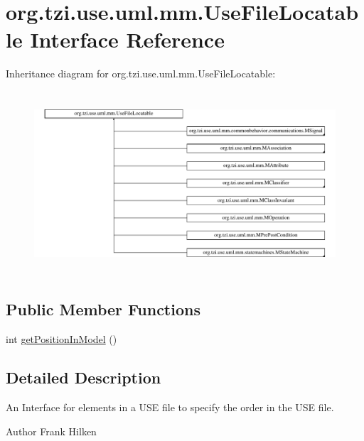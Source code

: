 \hypertarget{interfaceorg_1_1tzi_1_1use_1_1uml_1_1mm_1_1_use_file_locatable}{\section{org.\-tzi.\-use.\-uml.\-mm.\-Use\-File\-Locatable Interface Reference}
\label{interfaceorg_1_1tzi_1_1use_1_1uml_1_1mm_1_1_use_file_locatable}
}
Inheritance diagram for org.\-tzi.\-use.\-uml.\-mm.\-Use\-File\-Locatable\-:\begin{figure}[H]
\begin{center}
\leavevmode
\includegraphics[height=6.866485cm]{interfaceorg_1_1tzi_1_1use_1_1uml_1_1mm_1_1_use_file_locatable}
\end{center}
\end{figure}
\subsection*{Public Member Functions}
\begin{DoxyCompactItemize}
\item 
int \hyperlink{interfaceorg_1_1tzi_1_1use_1_1uml_1_1mm_1_1_use_file_locatable_a792d2eb3e329124cc815f55390794d56}{get\-Position\-In\-Model} ()
\end{DoxyCompactItemize}


\subsection{Detailed Description}
An Interface for elements in a U\-S\-E file to specify the order in the U\-S\-E file.

\begin{DoxyAuthor}{Author}
Frank Hilken 
\end{DoxyAuthor}


